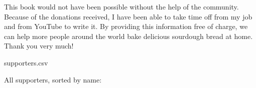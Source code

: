 This book would not have been possible without the help of the community.
Because of the donations received, I have been able to take time off from
my job and from YouTube to write it. By providing this information free
of charge, we can help more people around the world bake delicious sourdough
bread at home. Thank you very much!\\

\begin{filecontents}{supporters.csv}
  \end{filecontents}

  {\large All supporters, sorted by name:}


